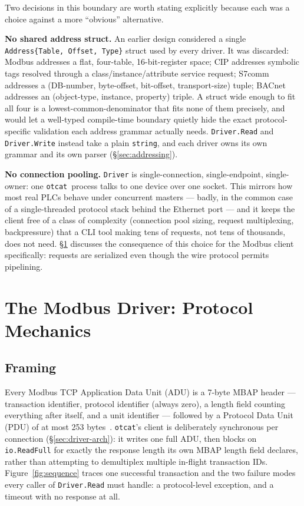 \documentclass[10pt,conference]{IEEEtran}
\newcommand{\otcat}{\texttt{otcat}}
\newcommand{\code}[1]{\texttt{#1}}
\begin{document}
Two decisions in this boundary are worth stating explicitly because
each was a choice against a more ``obvious'' alternative.

\textbf{No shared address struct.} An earlier design considered a
single \code{Address\{Table, Offset, Type\}} struct used by every
driver. It was discarded: Modbus addresses a flat, four-table,
16-bit-register space; CIP addresses symbolic tags resolved through a
class/instance/attribute service request; S7comm addresses a
(DB-number, byte-offset, bit-offset, transport-size) tuple; BACnet
addresses an (object-type, instance, property) triple. A struct wide
enough to fit all four is a lowest-common-denominator that fits none
of them precisely, and would let a well-typed compile-time boundary
quietly hide the exact protocol-specific validation each address
grammar actually needs. \code{Driver.Read} and \code{Driver.Write}
instead take a plain \code{string}, and each driver owns its own
grammar and its own parser (\S\ref{sec:addressing}).

\textbf{No connection pooling.} \code{Driver} is single-connection,
single-endpoint, single-owner: one \otcat\ process talks to one
device over one socket. This mirrors how most real PLCs behave under
concurrent masters --- badly, in the common case of a single-threaded
protocol stack behind the Ethernet port --- and it keeps the client
free of a class of complexity (connection pool sizing, request
multiplexing, backpressure) that a CLI tool making tens of requests,
not tens of thousands, does not need. \S\ref{sec:mechanics} discusses
the consequence of this choice for the Modbus client specifically:
requests are serialized even though the wire protocol permits
pipelining.


\section{The Modbus Driver: Protocol Mechanics}
\label{sec:mechanics}

\subsection{Framing}

Every Modbus TCP Application Data Unit (ADU) is a 7-byte MBAP header ---
transaction identifier, protocol identifier (always zero), a length
field counting everything after itself, and a unit identifier ---
followed by a Protocol Data Unit (PDU) of at most 253
bytes~\cite{modbus_tcp_guide}. \otcat's client is deliberately
synchronous per connection (\S\ref{sec:driver-arch}): it writes one
full ADU, then blocks on \code{io.ReadFull} for exactly the response
length its own MBAP length field declares, rather than attempting to
demultiplex multiple in-flight transaction IDs. Figure~\ref{fig:sequence}
traces one successful transaction and the two failure modes every
caller of \code{Driver.Read} must handle: a protocol-level exception,
and a timeout with no response at all.
\end{document}
